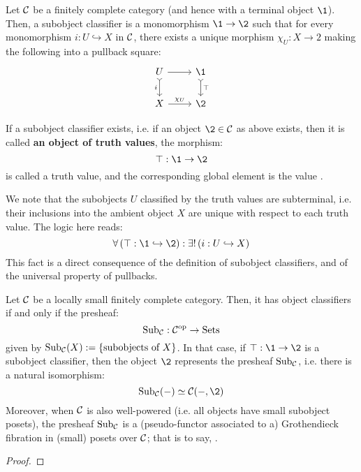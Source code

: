         \begin{definition}
            Let $\mathcal{C}$ be a finitely complete category (and hence with a terminal object $\1$). Then, a subobject classifier is a monomorphism $\1 \to \2$ such that for every monomorphism $i: U \hookrightarrow X$ in $\mathcal{C}$, there exists a unique morphism $\chi_U: X \to 2$ making the following into a pullback square:
                $$
                    \begin{tikzcd}
                        U \arrow[d, "i"', tail] \arrow[r] & \1 \arrow[d, "\top", tail] \\
                        X \arrow[r, "\chi_U"]             & \2                         
                    \end{tikzcd}
                $$
        \end{definition}
        \begin{convention}
            If a subobject classifier exists, i.e. if an object $\2 \in \C$ as above exists, then it is called \textbf{an object of truth values}, the morphism:
                $$\top: \1 \to \2$$
            is called a truth value, and the corresponding global element is the value .
            
            We note that the subobjects $U$ classified by the truth values are subterminal, i.e. their inclusions into the ambient object $X$ are unique with respect to each truth value. The logic here reads:
                $$\forall \left(\top: \1 \hookrightarrow \2\right): \exists! \left(i: U \hookrightarrow X\right)$$
            This fact is a direct consequence of the definition of subobject classifiers, and of the universal property of pullbacks.
        \end{convention}
        
        \begin{proposition}
            Let $\mathcal{C}$ be a locally small finitely complete category. Then, it has object classifiers if and only if the presheaf:
                $$\mathrm{Sub}_{\mathcal{C}}: \mathcal{C}^{\mathrm{op}} \to \mathrm{Sets}$$
            given by $\mathrm{Sub}_{\mathcal{C}}(X) := \{\text{subobjects of $X$}\}$. In that case, if $\top: \1 \to \2$ is a subobject classifier, then the object $\2$ represents the presheaf $\mathrm{Sub}_{\mathcal{C}}$, i.e. there is a natural isomorphism:
                $$\Sub_{\C}(-) \cong \C(-, \2)$$
            Moreover, when $\mathcal{C}$ is also well-powered (i.e. all objects have small subobject posets), the presheaf $\mathrm{Sub}_{\mathcal{C}}$ is a (pseudo-functor associated to a) Grothendieck fibration in (small) posets over $\mathcal{C}$; that is to say, . 
        \end{proposition}
            \begin{proof}
                
            \end{proof}
            

